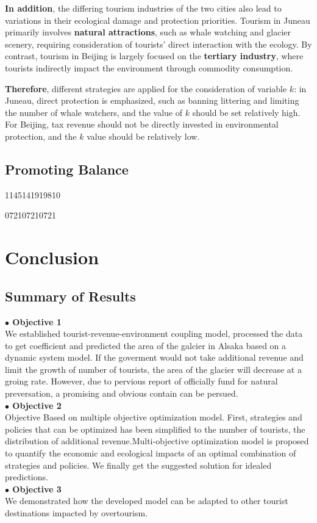 \documentclass[UTF8]{mcmthesis}
\begin{document}
    \textbf{In addition}, the differing tourism industries of the two cities also lead to variations in their ecological damage and protection priorities. Tourism in Juneau primarily involves \textbf{natural attractions}, such as whale watching and glacier scenery, requiring consideration of tourists' direct interaction with the ecology. By contrast, tourism in Beijing is largely focused on the \textbf{tertiary industry}, where tourists indirectly impact the environment through commodity consumption. 
                
\textbf{Therefore}, different strategies are applied for the consideration of variable \(k\): in Juneau, direct protection is emphasized, such as banning littering and limiting the number of whale watchers, and the value of \(k\) should be set relatively high. For Beijing, tax revenue should not be directly invested in environmental protection, and the \(k\) value should be relatively low.
                
            \subsection{Promoting Balance}
            1145141919810

            072107210721
            \section{Conclusion}
            \subsection{Summary of Results}

 \textbf{$\bullet$ Objective 1}\\ 
            \hspace*{2em} We established tourist-revenue-environment coupling model, processed the data to get coefficient and predicted the area of the galcier in Alsaka based on a dynamic system model.
            If the goverment would not take additional revenue and limit the growth of number of tourists, the area of the glacier will decrease at a groing rate. However, due to pervious report of officially fund for natural preversation, a promising and obvious contain can be persued.\\
   \textbf{$\bullet$ Objective 2}\\ \hspace*{2em} Objective Based on multiple objective optimization model. First, strategies and policies that can be optimized has been simplified to the number of tourists, the distribution of additional revenue.Multi-objective optimization model is proposed to quantify the economic and ecological impacts of an optimal combination of strategies and policies.
            We finally get the suggested solution for idealed predictions.\\
     \textbf{$\bullet$ Objective 3}\\
            \hspace*{2em} We demonstrated how the developed model can be adapted to other tourist destinations impacted by overtourism.
            
\end{document}
